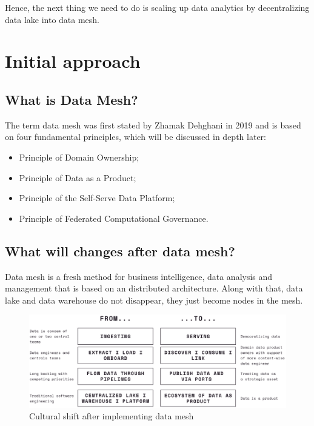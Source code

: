 \documentclass[12pt, a4paper]{book}
\begin{document}
Hence, the next thing we need to do is scaling up data analytics by decentralizing data lake into data mesh.\cite{datameshweb}

\section{Initial approach}
\subsection{What is Data Mesh?}
The term data mesh was first stated by Zhamak Dehghani in 2019 and is based on four fundamental principles, which will be discussed in depth later:
	\begin{itemize}[nosep]
		\item Principle of Domain Ownership;
		\item Principle of Data as a Product;
		\item Principle of the Self-Serve Data Platform;
		\item Principle of Federated Computational Governance.
	\end{itemize}


\subsection{What will changes after data mesh?}
Data mesh is a fresh method for business intelligence, data analysis and management that is based on an distributed architecture. Along with that, data lake and data warehouse do not disappear, they just become nodes in the mesh. \cite{machado2022data,shiftkpmg}

\begin{figure}[ht]
	\begin{framed}
		\centering
		\includegraphics[width=16.5cm]{CulturalShift.png}
		\caption{Cultural shift after implementing data mesh}
		\label{culturalshift}
	\end{framed}
\end{figure}
\end{document}

